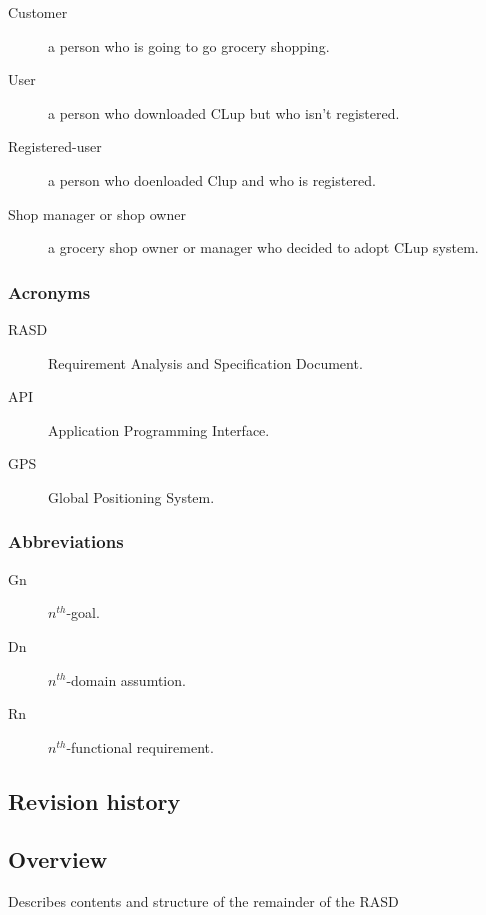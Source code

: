 \begin{description}
    \item[Customer]
    a person who is going to go grocery shopping.
    \item[User]
    a person who downloaded CLup but who isn't registered.
    \item[Registered-user]
    a person who doenloaded Clup and who is registered. 
    \item[Shop manager or shop owner] 
    a grocery shop owner or manager who decided to adopt CLup system. 
\end{description}

\subsubsection{Acronyms}
\label{subsect:acronyms}

\begin{description}
    \item[RASD]
    Requirement Analysis and Specification Document. 
    \item[API]
    Application Programming Interface. 
    \item[GPS]      
    Global Positioning System. 
\end{description}

\subsubsection{Abbreviations}
\label{subsect:abbreviations}

\begin{description}
    \item[Gn]
    $n^{th}$-goal. 
    \item[Dn]
    $n^{th}$-domain assumtion.
    \item[Rn]  
    $n^{th}$-functional requirement. 
\end{description}

\subsection{Revision history}
\label{subsect:revisionhistory}


\subsection{Overview}
\label{subsect:overview}

Describes contents and structure of the remainder of the RASD